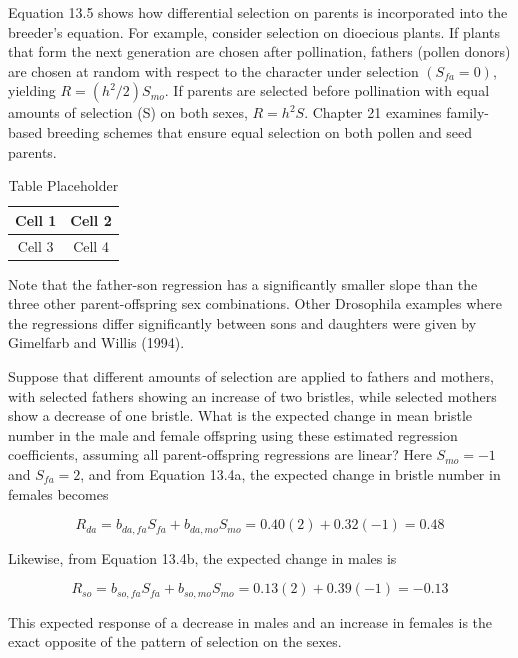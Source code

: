 \documentclass{article}
\begin{document}
Equation 13.5 shows how differential selection on parents is incorporated into the breeder's equation. For example, consider selection on dioecious plants. If plants that form the next generation are chosen after pollination, fathers (pollen donors) are chosen at random with respect to the character under selection  $ (S_{fa} = 0) $, yielding  $ R = (h^{2}/2)S_{mo} $. If parents are selected before pollination with equal amounts of selection (S) on both sexes,  $ R = h^{2}S $. Chapter 21 examines family-based breeding schemes that ensure equal selection on both pollen and seed parents.

\begin{table}[h]
\centering
\begin{tabular}{|c|c|}
\hline
Cell 1 & Cell 2 \\
\hline
Cell 3 & Cell 4 \\
\hline
\end{tabular}
\caption{Table Placeholder}
\end{table}

Note that the father-son regression has a significantly smaller slope than the three other parent-offspring sex combinations. Other Drosophila examples where the regressions differ significantly between sons and daughters were given by Gimelfarb and Willis (1994).

Suppose that different amounts of selection are applied to fathers and mothers, with selected fathers showing an increase of two bristles, while selected mothers show a decrease of one bristle. What is the expected change in mean bristle number in the male and female offspring using these estimated regression coefficients, assuming all parent-offspring regressions are linear? Here  $ S_{mo} = -1 $ and  $ S_{fa} = 2 $, and from Equation 13.4a, the expected change in bristle number in females becomes

\begin{equation}
R_{da}=b_{da,fa}S_{fa}+b_{da,mo}S_{mo}=0.40\left(2\right)+0.32\left(-1\right)=0.48
\end{equation}

Likewise, from Equation 13.4b, the expected change in males is

\begin{equation}
R_{s o}=b_{s o,f a}S_{f a}+b_{s o,m o}S_{m o}=0.13\left(2\right)+0.39\left(-1\right)=-0.13
\end{equation}

This expected response of a decrease in males and an increase in females is the exact opposite of the pattern of selection on the sexes.
\end{document}

